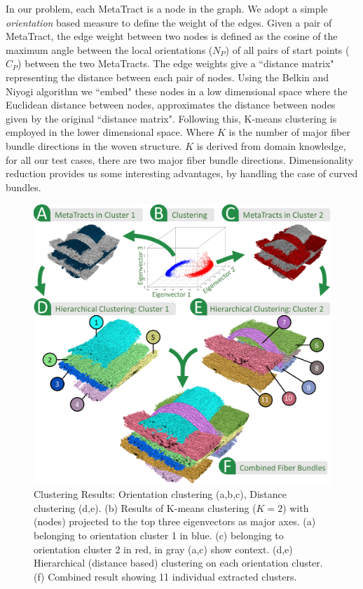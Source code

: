 In our problem, each MetaTract is a node in the graph. We adopt a simple \textit{orientation} based measure to define the weight of the edges. Given a pair of MetaTract, the edge weight between two nodes is defined as the cosine of the maximum angle between the local orientations ($N_P$) of all pairs of start points ($C_P$) between the two MetaTracts. The edge weights give a ``distance matrix" representing the distance between each pair of nodes. Using the Belkin and Niyogi algorithm we ``embed" these nodes in a low dimensional space where the Euclidean distance between nodes, approximates the distance between nodes given by the original ``distance matrix". 
Following this, K-means clustering is employed in the lower dimensional space. Where $K$ is the number of major fiber bundle directions in the woven structure. $K$ is derived from domain knowledge,
for all our test cases, there are two major fiber bundle directions. 
Dimensionality reduction provides us some interesting advantages, by handling the case of curved bundles.
\begin{figure}[t] 
	\centering  	
	\includegraphics[width=\linewidth]{images/clustering.eps}
	\caption{Clustering Results: Orientation clustering (a,b,c), Distance clustering (d,e).
		 (b) Results of K-means clustering ($K=2$) with \mt (nodes) projected to the top three eigenvectors as major axes. (a) \mt belonging to orientation cluster 1 in blue. (c) \mt belonging to orientation cluster 2 in red, \mt in gray (a,c) show context.
		(d,e) Hierarchical (distance based) clustering on each orientation cluster. (f) Combined result showing 11 individual extracted clusters. }
	\label{fig:orientation_clustering}
	\vskip-0.2cm
\end{figure} 
